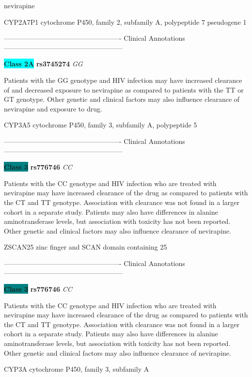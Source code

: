 \documentclass{resume} %
\begin{document}
\begin{rSection}{ nevirapine }
\begin{rSubsection}{ CYP2A7P1 }{ cytochrome P450, family 2, subfamily A, polypeptide 7 pseudogene 1 }{}{}
\item[] ---------------------------------------------------- Clinical Annotations -----------------------------------------------------\newline
\item \textbf{\colorbox{cyan} {Class 2A}} \textbf{ rs3745274 } \textit{ GG }
\item[] Patients with the GG genotype and HIV infection may have increased clearance of and decreased exposure to nevirapine as compared to patients with the TT or GT genotype. Other genetic and clinical factors may also influence clearance of nevirapine and exposure to drug.
\end{rSubsection}\begin{rSubsection}{ CYP3A5 }{ cytochrome P450, family 3, subfamily A, polypeptide 5 }{}{}
\item[]

\item[] ---------------------------------------------------- Clinical Annotations -----------------------------------------------------\newline
\item \textbf{\colorbox{teal} {Class 3}} \textbf{ rs776746 } \textit{ CC }
\item[] Patients with the CC genotype and HIV infection who are treated with nevirapine may have increased clearance of the drug as compared to patients with the CT and TT genotype. Association with clearance was not found in a larger cohort in a separate study. Patients may also have differences in alanine aminotransferase levels, but association with toxicity has not been reported. Other genetic and clinical factors may also influence clearance of nevirapine.
\end{rSubsection}\begin{rSubsection}{ ZSCAN25 }{ zinc finger and SCAN domain containing 25 }{}{}
\item[]

\item[] ---------------------------------------------------- Clinical Annotations -----------------------------------------------------\newline
\item \textbf{\colorbox{teal} {Class 3}} \textbf{ rs776746 } \textit{ CC }
\item[] Patients with the CC genotype and HIV infection who are treated with nevirapine may have increased clearance of the drug as compared to patients with the CT and TT genotype. Association with clearance was not found in a larger cohort in a separate study. Patients may also have differences in alanine aminotransferase levels, but association with toxicity has not been reported. Other genetic and clinical factors may also influence clearance of nevirapine.
\end{rSubsection}\begin{rSubsection}{ CYP3A }{ cytochrome P450, family 3, subfamily A }{}{}
\item[]


\end{rSubsection}
\end{rSection}
\end{document}
